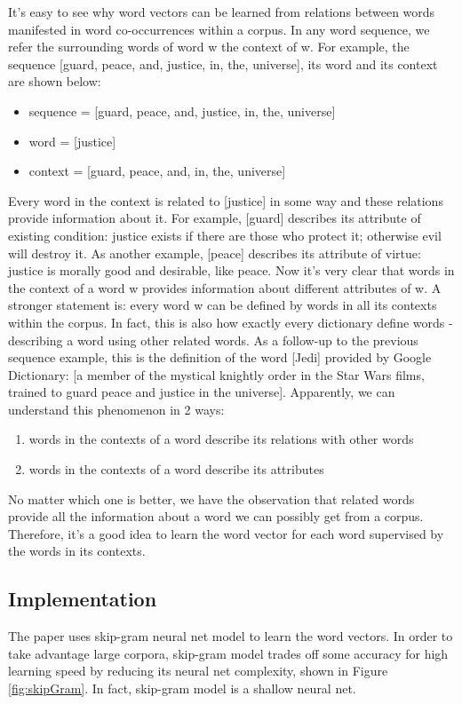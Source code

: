 \documentclass{article}
\begin{document}
It's easy to see why word vectors can be learned from relations between words manifested in word co-occurrences within a corpus. In any word sequence, we refer the surrounding words of word w the context of w. For example, the sequence [guard, peace, and, justice, in, the, universe], its word and its context are shown below:
\begin{itemize}
	\item sequence = [guard, peace, and, justice, in, the, universe]
	\item word = [justice]
	\item context = [guard, peace, and, in, the, universe]
\end{itemize}
Every word in the context is related to [justice] in some way and these relations provide information about it. For example, [guard] describes its attribute of existing condition: justice exists if there are those who protect it; otherwise evil will destroy it. As another example, [peace] describes its attribute of virtue: justice is morally good and desirable, like peace. Now it's very clear that words in the context of a word w provides information about different attributes of w. A stronger statement is: every word w can be defined by words in all its contexts within the corpus. In fact, this is also how exactly every dictionary define words - describing a word using other related words. As a follow-up to the previous sequence example, this is the definition of the word [Jedi] provided by Google Dictionary: [a member of the mystical knightly order in the Star Wars films, trained to guard peace and justice in the universe]. Apparently, we can understand this phenomenon in 2 ways:
\begin{enumerate}
	\item words in the contexts of a word describe its relations with other words
	\item words in the contexts of a word describe its attributes
\end{enumerate}
No matter which one is better, we have the observation that related words provide all the information about a word we can possibly get from a corpus. Therefore, it's a good idea to learn the word vector for each word supervised by the words in its contexts.

\subsection{Implementation}

The paper uses skip-gram neural net model to learn the word vectors. In order to take advantage large corpora, skip-gram model trades off some accuracy for high learning speed by reducing its neural net complexity, shown in Figure \ref{fig:skipGram}. In fact, skip-gram model is a shallow neural net.
\end{document}

